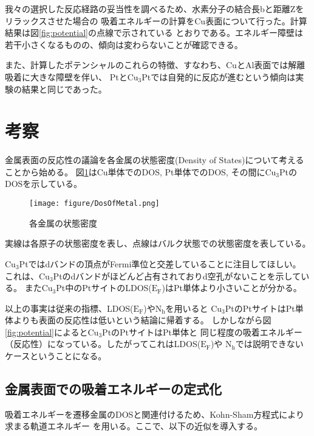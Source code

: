 \documentclass[12pt]{ltjsarticle}
\begin{document}
我々の選択した反応経路の妥当性を調べるため、水素分子の結合長bと距離Zをリラックスさせた場合の
吸着エネルギーの計算をCu表面について行った。計算結果は図\ref{fig:potential}の点線で示されている
とおりである。エネルギー障壁は若干小さくなるものの、傾向は変わらないことが確認できる。

また、計算したポテンシャルのこれらの特徴、すなわち、CuとAl表面では解離吸着に大きな障壁を伴い、
Ptと$\text{Cu}_\text{3}$Ptでは自発的に反応が進むという傾向は実験の結果と同じであった。

\section{考察}

金属表面の反応性の議論を各金属の状態密度(Density of States)について考えることから始める。
図\ref{fig:dosmetal}はCu単体でのDOS, Pt単体でのDOS, その間に$\text{Cu}_\text{3}$Ptの
DOSを示している。

\begin{figure}[hbtp]
    \begin{center}
     \texttt{[image: figure/DosOfMetal.png]}
    \end{center}
    \caption{各金属の状態密度}
    \label{fig:dosmetal}
\end{figure}

実線は各原子の状態密度を表し、点線はバルク状態での状態密度を表している。

$\text{Cu}_\text{3}$Ptではdバンドの頂点がFermi準位と交差していることに注目してほしい。
これは、$\text{Cu}_\text{3}$Ptのdバンドがほどんど占有されておりd空孔がないことを示している。
また$\text{Cu}_\text{3}$Pt中のPtサイトのLDOS($\text{E}_\text{F}$)はPt単体より小さいことが分かる。

以上の事実は従来の指標、LDOS($\text{E}_\text{F}$)や$\text{N}_\text{h}$を用いると
$\text{Cu}_\text{3}$PtのPtサイトはPt単体よりも表面の反応性は低いという結論に帰着する。
しかしながら図\ref{fig:potential}によると$\text{Cu}_\text{3}$PtのPtサイトはPt単体と
同じ程度の吸着エネルギー（反応性）になっている。したがってこれはLDOS($\text{E}_\text{F}$)や
$\text{N}_\text{h}$では説明できないケースということになる。

\subsection{金属表面での吸着エネルギーの定式化}
吸着エネルギーを遷移金属のDOSと関連付けるため、Kohn-Sham方程式により求まる軌道エネルギー
を用いる。ここで、以下の近似を導入する。\\
\end{document}
